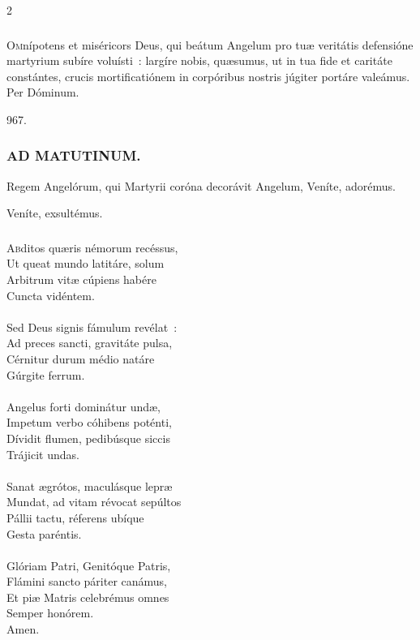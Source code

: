 \documentclass[9pt,twoside]{extarticle}
\begin{document}
\begin{multicols}{2}
\subsubsection*{\center {}}
\lettrine{O}mnípotens et miséricors Deus, qui beátum Angelum pro tuæ veritátis defensióne martyrium subíre voluísti~: largíre nobis, quæsumus, ut in tua fide et caritáte constántes, crucis mortificatiónem in corpóribus nostris júgiter portáre valeámus. Per Dóminum.

\begin{tightlist}{}
\item {} 967.
\end{tightlist}

\subsubsection*{\center \textsc{AD MATUTINUM.}}
\begin{tightlist}{}
\item {} Regem Angelórum, qui Martyrii coróna decorávit Angelum, \textred{*} Veníte, adorémus.
\item {} Veníte, exsultémus.
\end{tightlist}

\subsubsection*{\center {}}
\lettrine{A}bditos quæris némorum recéssus,\\
Ut queat mundo latitáre, solum\\
Arbitrum vitæ cúpiens habére\\
Cuncta vidéntem.\\
\\
Sed Deus signis fámulum revélat~:\\
Ad preces sancti, gravitáte pulsa,\\
Cérnitur durum médio natáre\\
Gúrgite ferrum.\\
\\
Angelus forti dominátur undæ,\\
Impetum verbo cóhibens poténti,\\
Dívidit flumen, pedibúsque siccis\\
Trájicit undas.\\
\\
Sanat ægrótos, maculásque lepræ\\
Mundat, ad vitam révocat sepúltos\\
Pállii tactu, réferens ubíque\\
Gesta paréntis.\\
\\
Glóriam Patri, Genitóque Patris,\\
Flámini sancto páriter canámus,\\
Et piæ Matris celebrémus omnes\\
Semper honórem.\\
Amen.


\end{multicols}
\end{document}
